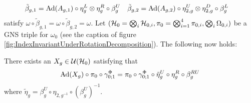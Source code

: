 \documentclass[12pt,a4paper,twoside]{article}
\numberwithin{equation}{section}
\begin{document}
\begin{align}
	\tilde{\beta}_{g,1}&=\Ad{A_{g,1}}\circ\eta_g^L\otimes\eta_g^R\circ\beta_g^U&\tilde{\beta}_{g,2}&=\Ad{A_{g,2}}\circ\eta_{2,g}^U\otimes\eta_{2,g}^D\circ\beta_g^L
\end{align}
satisfy $\omega\circ\tilde{\beta}_{g,1}=\omega\circ\tilde{\beta}_{g,2}=\omega$. Let $(\mathcal H_0=\bigotimes_i\mathcal H_{0,i},\pi_0=\bigotimes_{i=1}^4\pi_{0,i},\bigotimes_i\Omega_{0,i})$ be a GNS triple for $\omega_0$ (see the caption of figure \ref{fig:IndexInvariantUnderRotationDecomposition}). The following now holds:
\begin{lemma}\label{lem:DefinitionX_gLemma}
	There exists an $X_g\in\mathcal U(\mathcal H_0)$ satisfying that
	\begin{equation}\label{eq:DefinitionX_gLemma}
		\Ad{X_g}\circ\pi_0\circ\gamma^\Phi_{0;1}=\pi_0\circ\gamma^\Phi_{0;1}\circ\tilde{\eta}^U_g\circ\eta^R_g\circ\beta_g^{RU}
	\end{equation}
	where $\tilde{\eta}_g=\beta_g^U\circ\eta_{2,g^{-1}}\circ(\beta_g^U)^{-1}$.
\end{lemma}
\end{document}
